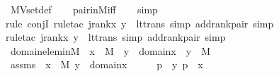 \begin{isabellebody}
\endisadelimproof
%
\isatagproof
{}\isamarkupfalse%
\ MVset{\isacharunderscore}{\kern0pt}def\isanewline
\ \ \isamarkupfalse%
\ pair{\isacharunderscore}{\kern0pt}in{\isacharunderscore}{\kern0pt}M{\isacharunderscore}{\kern0pt}iff\isanewline
\ \ \isamarkupfalse%
\ simp\isanewline
\ \ \isamarkupfalse%
{\isacharparenleft}{\kern0pt}rule\ conjI{\isacharcomma}{\kern0pt}\ rule{\isacharunderscore}{\kern0pt}tac\ j{\isacharequal}{\kern0pt}{\isachardoublequoteopen}rank{\isacharparenleft}{\kern0pt}{\isacharless}{\kern0pt}x{\isacharcomma}{\kern0pt}\ y{\isachargreater}{\kern0pt}{\isacharparenright}{\kern0pt}{\isachardoublequoteclose}\ \ lt{\isacharunderscore}{\kern0pt}trans{\isacharcomma}{\kern0pt}\ simp\ add{\isacharcolon}{\kern0pt}rank{\isacharunderscore}{\kern0pt}pair{}{\isacharcomma}{\kern0pt}\ simp{\isacharparenright}{\kern0pt}\isanewline
\ \ \isamarkupfalse%
{\isacharparenleft}{\kern0pt}rule{\isacharunderscore}{\kern0pt}tac\ j{\isacharequal}{\kern0pt}{\isachardoublequoteopen}rank{\isacharparenleft}{\kern0pt}{\isacharless}{\kern0pt}x{\isacharcomma}{\kern0pt}\ y{\isachargreater}{\kern0pt}{\isacharparenright}{\kern0pt}{\isachardoublequoteclose}\ \ lt{\isacharunderscore}{\kern0pt}trans{\isacharcomma}{\kern0pt}\ simp\ add{\isacharcolon}{\kern0pt}rank{\isacharunderscore}{\kern0pt}pair{}{\isacharcomma}{\kern0pt}\ simp{\isacharparenright}{\kern0pt}\isanewline
\ \ \isamarkupfalse%
%
\endisatagproof
{\isafoldproof}%
%
\isadelimproof
\isanewline
%
\endisadelimproof
\ \isanewline
{}\isamarkupfalse%
\ domain{\isacharunderscore}{\kern0pt}elem{\isacharunderscore}{\kern0pt}in{\isacharunderscore}{\kern0pt}M\ {\isacharcolon}{\kern0pt}\ {\isachardoublequoteopen}x\ {\isasymin}\ M\ {\isasymLongrightarrow}\ y\ {\isasymin}\ domain{\isacharparenleft}{\kern0pt}x{\isacharparenright}{\kern0pt}\ {\isasymLongrightarrow}\ y\ {\isasymin}\ M{\isachardoublequoteclose}\ \isanewline
%
\isadelimproof
%
\endisadelimproof
%
\isatagproof
{}\isamarkupfalse%
\ {\isacharminus}{\kern0pt}\ \isanewline
\ \ \isamarkupfalse%
\ assms\ {\isacharcolon}{\kern0pt}\ {\isachardoublequoteopen}x\ {\isasymin}\ M{\isachardoublequoteclose}\ {\isachardoublequoteopen}y\ {\isasymin}\ domain{\isacharparenleft}{\kern0pt}x{\isacharparenright}{\kern0pt}{\isachardoublequoteclose}\isanewline
\ \ \isamarkupfalse%
\ \isamarkupfalse%
\ p\ \ {\isachardoublequoteopen}{\isacharless}{\kern0pt}y{\isacharcomma}{\kern0pt}\ p{\isachargreater}{\kern0pt}\ {\isasymin}\ x{\isachardoublequoteclose}\ \isamarkupfalse%

\end{isabellebody}
